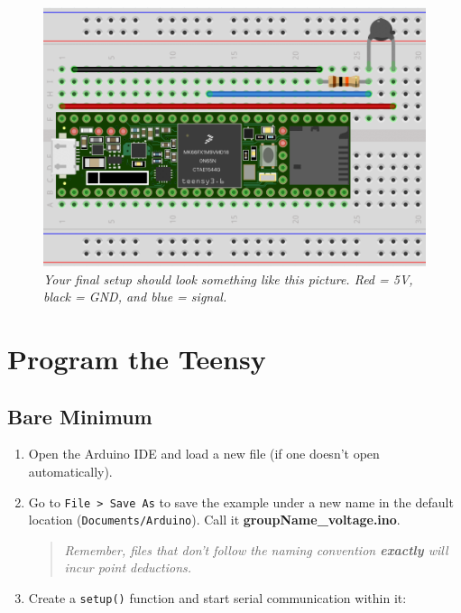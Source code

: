 \documentclass[]{book}
\begin{document}
\begin{figure}
\centering
\includegraphics{images/breadboard_thermistor_teensy.png}
\caption{\emph{Your final setup should look something like this picture. Red = 5V, black = GND, and blue = signal. }}
\end{figure}

\hypertarget{program-the-teensy-1}{%
\section{Program the Teensy}\label{program-the-teensy-1}}

\hypertarget{bare-minimum}{%
\subsection{Bare Minimum}\label{bare-minimum}}

\begin{enumerate}
\def\labelenumi{\arabic{enumi}.}
\item
  Open the Arduino IDE and load a new file (if one doesn't open automatically).
\item
  Go to \texttt{File\ \textgreater{}\ Save\ As} to save the example under a new name in the default location (\texttt{Documents/Arduino}). Call it \textbf{groupName\_voltage.ino}.

  \begin{quote}
  \emph{Remember, files that don't follow the naming convention \textbf{exactly} will incur point deductions.}
  \end{quote}
\item
  Create a \texttt{setup()} function and start serial communication within it:
\end{enumerate}
\end{document}
